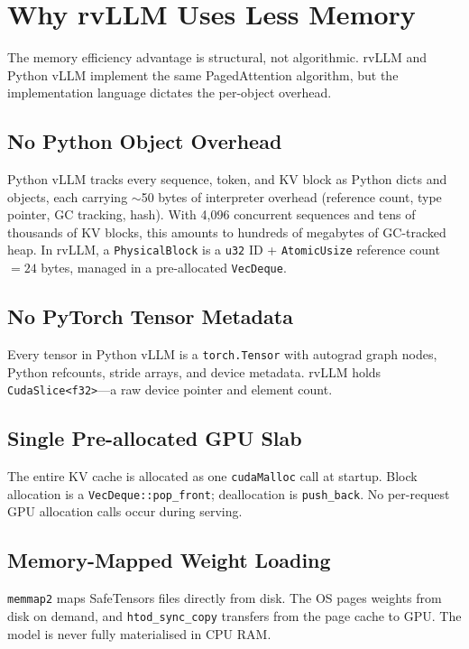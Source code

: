 \documentclass[11pt,a4paper]{article}
\begin{document}
\section{Why rvLLM Uses Less Memory}
\label{sec:memory}

The memory efficiency advantage is structural, not algorithmic. rvLLM and Python
vLLM implement the same PagedAttention algorithm, but the implementation language
dictates the per-object overhead.

\subsection{No Python Object Overhead}

Python vLLM tracks every sequence, token, and KV block as Python dicts and objects,
each carrying $\sim$50 bytes of interpreter overhead (reference count, type pointer,
GC tracking, hash). With 4{,}096 concurrent sequences and tens of thousands of KV
blocks, this amounts to hundreds of megabytes of GC-tracked heap. In rvLLM, a
\texttt{PhysicalBlock} is a \texttt{u32} ID + \texttt{AtomicUsize} reference count
$= 24$ bytes, managed in a pre-allocated \texttt{VecDeque}.

\subsection{No PyTorch Tensor Metadata}

Every tensor in Python vLLM is a \texttt{torch.Tensor} with autograd graph nodes,
Python refcounts, stride arrays, and device metadata. rvLLM holds
\texttt{CudaSlice<f32>}---a raw device pointer and element count.

\subsection{Single Pre-allocated GPU Slab}

The entire KV cache is allocated as one \texttt{cudaMalloc} call at startup. Block
allocation is a \texttt{VecDeque::pop\_front}; deallocation is \texttt{push\_back}.
No per-request GPU allocation calls occur during serving.

\subsection{Memory-Mapped Weight Loading}

\texttt{memmap2} maps SafeTensors files directly from disk. The OS pages weights
from disk on demand, and \texttt{htod\_sync\_copy} transfers from the page cache
to GPU. The model is never fully materialised in CPU RAM.
\end{document}
